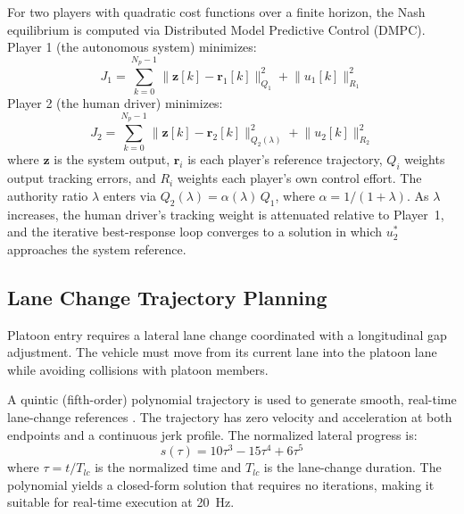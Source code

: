 \documentclass[12pt,a4paper,oneside]{report}
\begin{document}
For two players with quadratic cost functions over a finite horizon, the Nash equilibrium is computed via Distributed Model Predictive Control (DMPC). Player 1 (the autonomous system) minimizes:
\begin{equation}
J_1 = \sum_{k=0}^{N_p-1} \bigl\|\mathbf{z}[k] - \mathbf{r}_1[k]\bigr\|_{Q_1}^2 + \bigl\|u_1[k]\bigr\|_{R_1}^2
\label{eq:cost_j1_intro}
\end{equation}
Player 2 (the human driver) minimizes:
\begin{equation}
J_2 = \sum_{k=0}^{N_p-1} \bigl\|\mathbf{z}[k] - \mathbf{r}_2[k]\bigr\|_{Q_2(\lambda)}^2 + \bigl\|u_2[k]\bigr\|_{R_2}^2
\label{eq:cost_j2_intro}
\end{equation}
where $\mathbf{z}$ is the system output, $\mathbf{r}_i$ is each player's reference trajectory,
$Q_i$ weights output tracking errors, and $R_i$ weights each player's own control effort.
The authority ratio $\lambda$ enters via $Q_2(\lambda) = \alpha(\lambda)\,Q_1$,
where $\alpha = 1/(1+\lambda)$. As $\lambda$ increases, the human driver's tracking weight
is attenuated relative to Player~1, and the iterative best-response loop converges to a
solution in which $u_2^*$ approaches the system reference.

\subsection{Lane Change Trajectory Planning}

Platoon entry requires a lateral lane change coordinated with a longitudinal gap adjustment. The vehicle must move from its current lane into the platoon lane while avoiding collisions with platoon members.

A quintic (fifth-order) polynomial trajectory is used to generate smooth, real-time lane-change references \cite{guHumanlikeMotionPlanning2014}. The trajectory has zero velocity and acceleration at both endpoints and a continuous jerk profile. The normalized lateral progress is:
\begin{equation}
s(\tau) = 10\tau^3 - 15\tau^4 + 6\tau^5
\label{eq:quintic_polynomial}
\end{equation}
where $\tau = t / T_{lc}$ is the normalized time and $T_{lc}$ is the lane-change duration. The polynomial yields a closed-form solution that requires no iterations, making it suitable for real-time execution at 20\, Hz.
\end{document}
